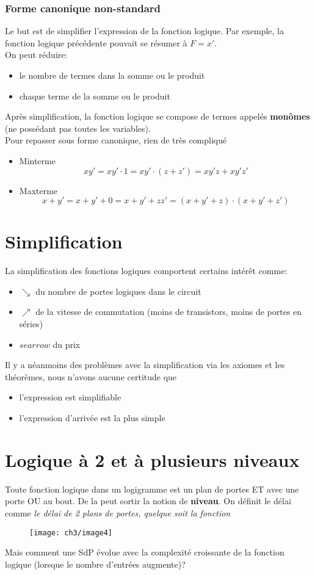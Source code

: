 \subsubsection{Forme canonique non-standard}
Le but est de simplifier l'expression de la fonction logique. Par exemple, la fonction logique précédente pouvait se résumer à $F=x'$.\\
On peut réduire:
\begin{itemize}
	\item le nombre de termes dans la somme ou le produit
	\item chaque terme de la somme ou le produit
\end{itemize}
Après simplification, la fonction logique se compose de termes appelés \textbf{monômes} (ne possédant pas toutes les variables).\\

Pour repasser sous forme canonique, rien de très compliqué
\begin{itemize}
	\item Minterme
	\begin{equation}
		xy'=xy'\cdot 1=xy'\cdot(z+z')=xy'z+xy'z'
	\end{equation}
	\item Maxterme
	\begin{equation}
		x+y'=x+y'+0=x+y'+zz'=(x+y'+z)\cdot(x+y'+z')
	\end{equation}
\end{itemize}
\section{Simplification}
La simplification des fonctions logiques comportent certains intérêt comme:
\begin{itemize}
	\item $\searrow$ du nombre de portes logiques dans le circuit
	\item $\nearrow$ de la vitesse de commutation (moins de transistors, moins de portes en séries)
	\item $searrow$ du prix
\end{itemize}
Il y a néanmoins des problèmes avec la simplification via les axiomes et les théorèmes, nous n'avons aucune certitude que 
\begin{itemize}
	\item l'expression est simplifiable
	\item l'expression d'arrivée est la plus simple
\end{itemize} 
\section{Logique à 2 et à plusieurs niveaux}
Toute fonction logique dans un logigramme est un plan de portes ET avec une porte OU au bout. De la peut sortir la notion de \textbf{niveau}. On définit le délai comme \textit{le délai de 2 plans de portes, quelque soit la fonction}
\begin{figure}[H]
	\centering
	\texttt{[image: ch3/image4]}
\end{figure}
Mais comment une SdP évolue avec la complexité croissante de la fonction logique (lorsque le nombre d'entrées augmente)?\\

